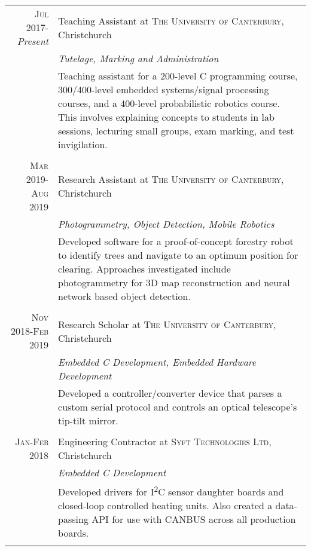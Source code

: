 \documentclass[a4paper,10pt]{article} %
\begin{document}
\begin{tabular}{r|p{11cm}}

\textsc{Jul 2017}-\emph{Present} & Teaching Assistant at \textsc{The University of Canterbury}, Christchurch \\
& \emph{Tutelage, Marking and Administration} \\
& \footnotesize{Teaching assistant for a 200-level C programming course, 300/400-level embedded systems/signal processing courses, and a 400-level probabilistic robotics course. This involves explaining concepts to students in lab sessions, lecturing small groups, exam marking, and test invigilation. } \\
\multicolumn{2}{c}{} \\


\textsc{Mar 2019-Aug 2019} & Research Assistant at \textsc{The University of Canterbury}, Christchurch \\
& \emph{Photogrammetry, Object Detection, Mobile Robotics}\\
& \footnotesize{Developed software for a proof-of-concept forestry robot to identify trees and navigate to an optimum position for clearing. Approaches investigated include photogrammetry for 3D map reconstruction and neural network based object detection. }\\
\multicolumn{2}{c}{} \\


\textsc{Nov 2018-Feb 2019} & Research Scholar at \textsc{The University of Canterbury}, Christchurch \\
& \emph{Embedded C Development, Embedded Hardware Development}\\
& \footnotesize{Developed a controller/converter device that parses a custom serial protocol and controls an optical telescope's tip-tilt mirror. }\\
\multicolumn{2}{c}{} \\


\textsc{Jan-Feb 2018} & Engineering Contractor at \textsc{Syft Technologies Ltd}, Christchurch \\
& \emph{Embedded C Development}\\
& \footnotesize{Developed drivers for I\textsuperscript{2}C sensor daughter boards and closed-loop controlled heating units. Also created a data-passing API for use with CANBUS across all production boards. }\\
\multicolumn{2}{c}{} \\


\end{tabular}
\end{document}
